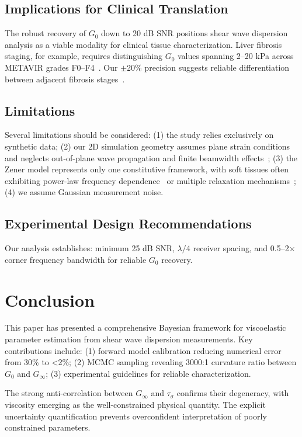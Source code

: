 \documentclass[journal]{IEEEtran}
\begin{document}
\subsection{Implications for Clinical Translation}

The robust recovery of $G_0$ down to 20 dB SNR positions shear wave dispersion analysis as a viable modality for clinical tissue characterization. Liver fibrosis staging, for example, requires distinguishing $G_0$ values spanning 2--20 kPa across METAVIR grades F0--F4~\cite{castera2012}. Our $\pm$20\% precision suggests reliable differentiation between adjacent fibrosis stages~\cite{friedrich2008}.

\subsection{Limitations}

Several limitations should be considered: (1) the study relies exclusively on synthetic data; (2) our 2D simulation geometry assumes plane strain conditions and neglects out-of-plane wave propagation and finite beamwidth effects~\cite{mcgough2004}; (3) the Zener model represents only one constitutive framework, with soft tissues often exhibiting power-law frequency dependence~\cite{magin2010} or multiple relaxation mechanisms~\cite{romano2016}; (4) we assume Gaussian measurement noise.

\subsection{Experimental Design Recommendations}

Our analysis establishes: minimum 25 dB SNR, $\lambda/4$ receiver spacing, and 0.5--2$\times$ corner frequency bandwidth for reliable $G_0$ recovery.

\section{Conclusion}

This paper has presented a comprehensive Bayesian framework for viscoelastic parameter estimation from shear wave dispersion measurements. Key contributions include: (1) forward model calibration reducing numerical error from 30\% to \textless2\%; (2) MCMC sampling revealing 3000:1 curvature ratio between $G_0$ and $G_\infty$; (3) experimental guidelines for reliable characterization.

The strong anti-correlation between $G_\infty$ and $\tau_\sigma$ confirms their degeneracy, with viscosity emerging as the well-constrained physical quantity. The explicit uncertainty quantification prevents overconfident interpretation of poorly constrained parameters.
\end{document}

